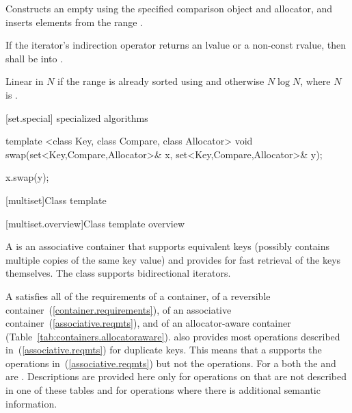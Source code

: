 \begin{itemdescr}
\pnum
\effects
Constructs an empty
using the specified comparison object and allocator,
and inserts elements from the range
.

\pnum
\requires If the iterator's indirection operator returns an lvalue or a
non-const rvalue, then  shall be
 into .

\pnum
\complexity
Linear in $N$ if the range
is already sorted using 
and otherwise $N \log{N}$,
where $N$ is
.
\end{itemdescr}

[set.special]{ specialized algorithms}

%
%
\begin{itemdecl}
template <class Key, class Compare, class Allocator>
  void swap(set<Key,Compare,Allocator>& x,
            set<Key,Compare,Allocator>& y);
\end{itemdecl}

\begin{itemdescr}
\pnum
\effects
\begin{codeblock}
x.swap(y);
\end{codeblock}
\end{itemdescr}

[multiset]{Class template }

[multiset.overview]{Class template  overview}

\pnum
{}%
A
is an associative container that supports equivalent keys (possibly contains multiple copies of
the same key value) and provides for fast retrieval of the keys themselves.
The
 class
supports bidirectional iterators.

\pnum
A  satisfies all of the requirements of a container, of a
reversible container~(\ref{container.requirements}), of an associative
container~(\ref{associative.reqmts}), and of an allocator-aware container
(Table~\ref{tab:containers.allocatoraware}).
also provides most operations described in~(\ref{associative.reqmts})
for duplicate keys.
This means that a
supports the
operations in~(\ref{associative.reqmts})
but not the
operations.
For a
both the
and
are
.
Descriptions are provided here only for operations on
that are not described in one of these tables
and for operations where there is additional semantic information.

